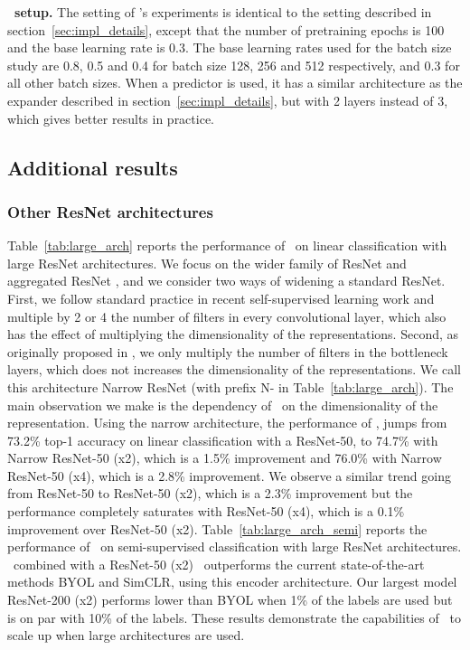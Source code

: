 \textbf{\algo \ setup.} The setting of \algo's experiments is identical to the setting described in section~\ref{sec:impl_details}, except that the number of pretraining epochs is 100 and the base learning rate is 0.3. The base learning rates used for the batch size study are 0.8, 0.5 and 0.4 for batch size 128, 256 and 512 respectively, and 0.3 for all other batch sizes. When a predictor is used, it has a similar architecture as the expander described in section~\ref{sec:impl_details}, but with 2 layers instead of 3, which gives better results in practice.

\subsection{Additional results} \label{app:additional_results}

\subsubsection{Other ResNet architectures}

Table~\ref{tab:large_arch} reports the performance of \algo \ on linear classification with large ResNet architectures. We focus on the wider family of ResNet \cite{zagoruyko2016resnetwide} and aggregated ResNet \cite{xie2017resnext}, and we consider two ways of widening a standard ResNet. First, we follow standard practice in recent self-supervised learning work \cite{caron2020swav, grill2020byol, chen2020simclr} and multiple by 2 or 4 the number of filters in every convolutional layer, which also has the effect of multiplying the dimensionality of the representations. Second, as originally proposed in \cite{zagoruyko2016resnetwide}, we only multiply the number of filters in the bottleneck layers, which does not increases the dimensionality of the representations. We call this architecture Narrow ResNet (with prefix N- in Table~\ref{tab:large_arch}). The main observation we make is the dependency of \algo \ on the dimensionality of the representation. Using the narrow architecture, the performance of \algo, jumps from 73.2\% top-1 accuracy on linear classification with a ResNet-50, to 74.7\% with Narrow ResNet-50 (x2), which is a 1.5\% improvement and 76.0\% with Narrow ResNet-50 (x4), which is a 2.8\% improvement. We observe a similar trend going from ResNet-50 to ResNet-50 (x2), which is a 2.3\% improvement but the performance completely saturates with ResNet-50 (x4), which is a 0.1\% improvement over ResNet-50 (x2). Table~\ref{tab:large_arch_semi} reports the performance of \algo \ on semi-supervised classification with large ResNet architectures. \algo \ combined with a ResNet-50 (x2) \ outperforms the current state-of-the-art methods BYOL and SimCLR, using this encoder architecture. Our largest model ResNet-200 (x2) performs lower than BYOL when 1\% of the labels are used but is on par with 10\% of the labels. These results demonstrate the capabilities of \algo \ to scale up when large architectures are used.


